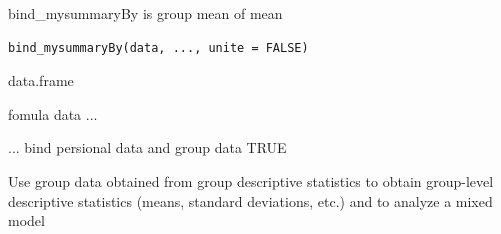 \documentclass[a4paper]{book}
\begin{document}
%
\begin{Description}
bind\_mysummaryBy is group mean of mean
\end{Description}
%
\begin{Usage}
\begin{verbatim}
bind_mysummaryBy(data, ..., unite = FALSE)
\end{verbatim}
\end{Usage}
%
\begin{Arguments}
\begin{ldescription}
\item[\code{data}] data.frame

\item[\code{...}] fomula data ...

\item[\code{unite}] ... bind persional data and group data  TRUE
\end{ldescription}
\end{Arguments}
%
\begin{Value}
Use group data obtained from group descriptive statistics to obtain group-level descriptive statistics (means, standard deviations, etc.) and to analyze a mixed model
\end{Value}
%
\end{document}
